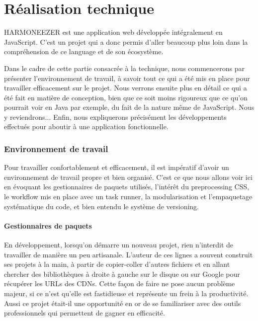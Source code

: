 \documentclass[a4paper,12pt]{article}
\begin{document}
\newpage


\part{Réalisation technique}

HARMONEEZER est une application web développée intégralement en JavaScript. C'est un projet qui a donc permis d'aller beaucoup plus loin dans la compréhension de ce language et de son écosystème.

Dans le cadre de cette partie consacrée à la technique, nous commencerons par présenter l'environnement de travail, à savoir tout ce qui a été mis en place pour travailler efficacement sur le projet. Nous verrons ensuite plus en détail ce qui a été fait en matière de conception, bien que ce soit moins rigoureux que ce qu'on pourrait voir en Java par exemple, du fait de la nature même de JavaScript. Nous y reviendrons... Enfin, nous expliquerons précisément les développements effectués pour aboutir à une application fonctionnelle.

\section{Environnement de travail}

Pour travailler confortablement et efficacement, il est impératif d'avoir un environnement de travail propre et bien organisé. C'est ce que nous allons voir ici en évoquant les gestionnaires de paquets utilisés, l'intérêt du preprocessing CSS, le workflow mis en place avec un task runner, la modularisation et l'empaquetage systématique du code, et bien entendu le système de versioning.

\subsection{Gestionnaires de paquets}

En développement, lorsqu'on démarre un nouveau projet, rien n'interdit de travailler de manière un peu artisanale. L'auteur de ces lignes a souvent construit ses projets à la main, à partir de copier-coller d'autres fichiers et en allant chercher des bibliothèques à droite à gauche sur le disque ou sur Google pour récupérer les URLs des CDNs. Cette façon de faire ne pose aucun problème majeur, si ce n'est qu'elle est fastidieuse et représente un frein à la productivité. Aussi ce projet était-il une opportunité en or de se familiariser avec des outils professionnels qui permettent de gagner en efficacité.
\end{document}
